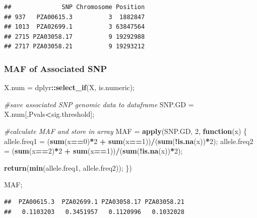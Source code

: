 \documentclass[
]{article}
\newenvironment{Shaded}{\begin{snugshade}}{\end{snugshade}}
\newcommand{\CommentTok}[1]{\textcolor[rgb]{0.56,0.35,0.01}{\textit{#1}}}
\newcommand{\ControlFlowTok}[1]{\textcolor[rgb]{0.13,0.29,0.53}{\textbf{#1}}}
\newcommand{\DecValTok}[1]{\textcolor[rgb]{0.00,0.00,0.81}{#1}}
\newcommand{\KeywordTok}[1]{\textcolor[rgb]{0.13,0.29,0.53}{\textbf{#1}}}
\newcommand{\NormalTok}[1]{#1}
\newcommand{\OperatorTok}[1]{\textcolor[rgb]{0.81,0.36,0.00}{\textbf{#1}}}
\newcommand{\StringTok}[1]{\textcolor[rgb]{0.31,0.60,0.02}{#1}}
\begin{document}
\begin{verbatim}
##              SNP Chromosome Position
## 937   PZA00615.3          3  1882847
## 1013  PZA02699.1          3 63847564
## 2715 PZA03058.17          9 19292988
## 2717 PZA03058.21          9 19293212
\end{verbatim}

\hypertarget{maf-of-associated-snp}{%
\subsubsection{MAF of Associated SNP}\label{maf-of-associated-snp}}

\begin{Shaded}
\begin{Highlighting}[]
\NormalTok{X.num =}\StringTok{ }\NormalTok{dplyr}\OperatorTok{::}\KeywordTok{select\_if}\NormalTok{(X, is.numeric); }

\CommentTok{\#save associated SNP genomic data to dataframe}
\NormalTok{SNP.GD =}\StringTok{ }\NormalTok{X.num[,Pvals}\OperatorTok{\textless{}}\NormalTok{sig.threshold];}

\CommentTok{\#calculate MAF and store in array}
\NormalTok{MAF =}\StringTok{ }\KeywordTok{apply}\NormalTok{(SNP.GD, }\DecValTok{2}\NormalTok{, }\ControlFlowTok{function}\NormalTok{(x)}
\NormalTok{  \{}
\NormalTok{  allele.freq1 =}\StringTok{ }\NormalTok{(}\KeywordTok{sum}\NormalTok{(x}\OperatorTok{==}\DecValTok{0}\NormalTok{)}\OperatorTok{*}\DecValTok{2} \OperatorTok{+}\StringTok{ }\KeywordTok{sum}\NormalTok{(x}\OperatorTok{==}\DecValTok{1}\NormalTok{))}\OperatorTok{/}\NormalTok{(}\KeywordTok{sum}\NormalTok{(}\OperatorTok{!}\KeywordTok{is.na}\NormalTok{(x))}\OperatorTok{*}\DecValTok{2}\NormalTok{);}
\NormalTok{  allele.freq2 =}\StringTok{ }\NormalTok{(}\KeywordTok{sum}\NormalTok{(x}\OperatorTok{==}\DecValTok{2}\NormalTok{)}\OperatorTok{*}\DecValTok{2} \OperatorTok{+}\StringTok{ }\KeywordTok{sum}\NormalTok{(x}\OperatorTok{==}\DecValTok{1}\NormalTok{))}\OperatorTok{/}\NormalTok{(}\KeywordTok{sum}\NormalTok{(}\OperatorTok{!}\KeywordTok{is.na}\NormalTok{(x))}\OperatorTok{*}\DecValTok{2}\NormalTok{);}
  
  \KeywordTok{return}\NormalTok{(}\KeywordTok{min}\NormalTok{(allele.freq1, allele.freq2));}
\NormalTok{  \})}

\NormalTok{MAF;}
\end{Highlighting}
\end{Shaded}

\begin{verbatim}
##  PZA00615.3  PZA02699.1 PZA03058.17 PZA03058.21 
##   0.1103203   0.3451957   0.1120996   0.1032028
\end{verbatim}
\end{document}
